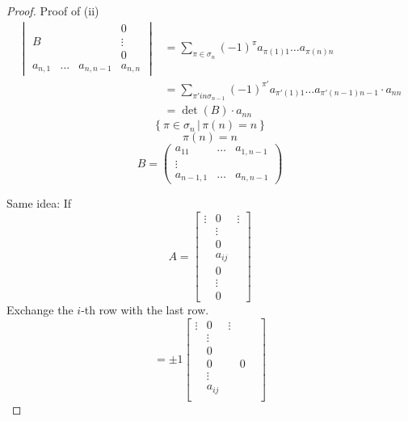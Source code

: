 \documentclass{article}
\newcommand{\setdef}[2]{\left\{\left.#1\,\right|\,#2\right\}}
\begin{document}
\begin{proof}
  Proof of (ii)
  \begin{align*}
    \begin{vmatrix}
             &         &           & 0  \\
      B      &         &           & \vdots \\
             &         &           & 0  \\
      a_{n,1} & \ldots & a_{n,n-1} & a_{n,n}
    \end{vmatrix}
    &= \sum_{\pi \in \sigma_n} (-1)^{\pi} a_{\pi(1) 1} \dots a_{\pi(n) n} \\
    &= \sum_{\pi' in \sigma_{n-1}} (-1)^{\pi'} a_{\pi'(1) 1} \dots a_{\pi'(n-1) n-1} \cdot a_{nn} \\
    &= \det(B) \cdot a_{nn}
  \end{align*}
  \[ \setdef{\pi \in \sigma_n}{\pi(n) = n} \]
  \[ \pi(n) = n \]
  \[
    B = \begin{pmatrix}
      a_{11} & \ldots & a_{1,n-1} \\
      \vdots &        & \\
      a_{n-1,1} & \ldots & a_{n,n-1}
    \end{pmatrix}
  \]

  Same idea: If
  \[
    A = \begin{bmatrix}
      \vdots & 0 & \vdots \\
      & \vdots & \\
      & 0 & \\
      & a_{ij} & \\
      & 0 & \\
      & \vdots & \\
      & 0 &
    \end{bmatrix}
  \]
  Exchange the $i$-th row with the last row.
  \[
    = \pm 1 \begin{bmatrix}
      \vdots & 0 & \vdots \\
      & \vdots & \\
      & 0 & \\
      & 0 &
      & 0 & \\
      & \vdots & \\
      & a_{ij} & \\
    \end{bmatrix}
  \]
\end{proof}
\end{document}
